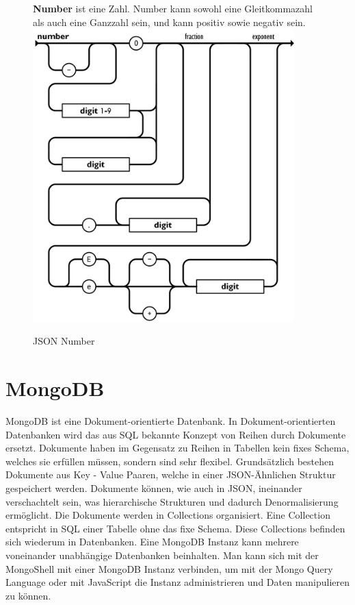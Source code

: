 \begin{figure}[H]
    \begin{minipage}[t]{0.45\textwidth}
        \textbf{Number} ist eine Zahl.
        Number kann sowohl eine Gleitkommazahl als auch eine Ganzzahl sein, und kann positiv sowie negativ sein.
        \includegraphics[width=0.9\textwidth]{images/json_number}
        \caption{JSON Number}
        \label{fig:json_number}
    \end{minipage}\hfill
\end{figure}

\section{MongoDB}
\label{sec:mongodb}

MongoDB ist eine Dokument-orientierte Datenbank. 
In Dokument-orientierten Datenbanken wird das aus SQL bekannte Konzept von Reihen durch Dokumente ersetzt.
Dokumente haben im Gegensatz zu Reihen in Tabellen kein fixes Schema, welches sie erfüllen müssen, sondern sind sehr flexibel.
Grundsätzlich bestehen Dokumente aus Key - Value Paaren, welche in einer JSON-Ähnlichen Struktur gespeichert werden.
Dokumente können, wie auch in JSON, ineinander verschachtelt sein, was hierarchische Strukturen und dadurch Denormalisierung ermöglicht.
Die Dokumente werden in Collections organisiert.
Eine Collection entspricht in SQL einer Tabelle ohne das fixe Schema.
Diese Collections befinden sich wiederum in Datenbanken.
Eine MongoDB Instanz kann mehrere voneinander unabhängige Datenbanken beinhalten.
Man kann sich mit der MongoShell mit einer MongoDB Instanz verbinden, um mit der Mongo Query Language oder mit JavaScript die Instanz administrieren und Daten manipulieren zu können.
~\autocite{bradshaw:mongodb}

